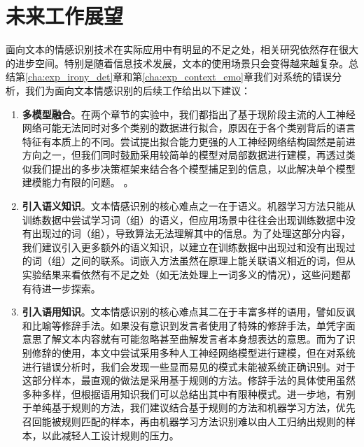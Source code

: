 \section{未来工作展望}

面向文本的情感识别技术在实际应用中有明显的不足之处，相关研究依然存在很大的进步空间。特别是随着信息技术发展，文本的使用场景只会变得越来越复杂。总结第\ref{cha:exp_irony_det}章和第\ref{cha:exp_context_emo}章我们对系统的错误分析，我们为面向文本情感识别的后续工作给出以下建议：

\begin{enumerate}

\item {\bf 多模型融合}。在两个章节的实验中，我们都指出了基于现阶段主流的人工神经网络可能无法同时对多个类别的数据进行拟合，原因在于各个类别背后的语言特征有本质上的不同。尝试提出拟合能力更强的人工神经网络结构固然是前进方向之一，但我们同时鼓励采用较简单的模型对局部数据进行建模，再透过类似我们提出的多步决策框架来结合各个模型捕足到的信息，以此解决单个模型建模能力有限的问题。
。

\item {\bf 引入语义知识}。文本情感识别的核心难点之一在于语义。机器学习方法只能从训练数据中尝试学习词（组）的语义，但应用场景中往往会出现训练数据中没有出现过的词（组），导致算法无法理解其中的信息。为了处理这部分内容，我们建议引入更多额外的语义知识，以建立在训练数据中出现过和没有出现过的词（组）之间的联系。词嵌入方法虽然在原理上能关联语义相近的词，但从实验结果来看依然有不足之处（如无法处理上一词多义的情况），这些问题都有待进一步探索。

\item {\bf 引入语用知识}。文本情感识别的核心难点其二在于丰富多样的语用，譬如反讽和比喻等修辞手法。如果没有意识到发言者使用了特殊的修辞手法，单凭字面意思了解文本内容就有可能忽略甚至曲解发言者本身想表达的意思。而为了识别修辞的使用，本文中尝试采用多种人工神经网络模型进行建模，但在对系统进行错误分析时，我们会发现一些显而易见的模式未能被系统正确识别。对于这部分样本，最直观的做法是采用基于规则的方法。修辞手法的具体使用虽然多种多样，但根据语用知识我们可以总结出其中有限种模式。进一步地，有别于单纯基于规则的方法，我们建议结合基于规则的方法和机器学习方法，优先召回能被规则匹配的样本，再由机器学习方法识别难以由人工归纳出规则的样本，以此减轻人工设计规则的压力。

\end{enumerate}







